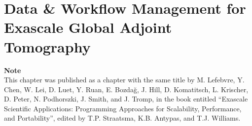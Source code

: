 \chapter[Data \& Workflow Management for Exascale Global Adjoint Tomography]{Data \& Workflow Management for Exascale Global Adjoint Tomography}
\label{ch:exascale_tomography}

\textbf{Note}\\
This chapter was published as a chapter with the same title by
M. Lefebvre, Y. Chen, W. Lei, D. Luet, Y. Ruan, E. Bozda\u g, J. Hill,
D. Komatitsch, L. Krischer, D. Peter, N. Podhorszki, J. Smith, and J. Tromp,
in the book entitled ``Exascale Scientific Applications: Programming Approaches
for Scalability, Performance, and Portability'', edited by T.P. Straatsma, K.B. Antypas, and T.J. Williams.












%

